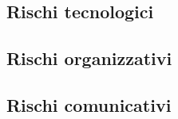\subsection{Rischi tecnologici}

\subsection{Rischi organizzativi}

\subsection{Rischi comunicativi}

